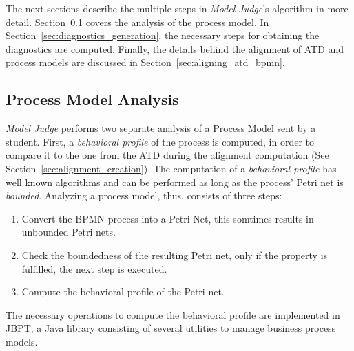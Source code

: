 The next sections describe the multiple steps in \emph{Model Judge}'s algorithm
in more detail. Section~\ref{sec:process_model_analysis} covers the analysis of
the process model. In Section~\ref{sec:diagnostics_generation}, the necessary
steps for obtaining the diagnostics are computed. Finally, the details behind
the alignment of ATD and process models are discussed in
Section~\ref{sec:aligning_atd_bpmn}.

\subsection{Process Model Analysis}
\label{sec:process_model_analysis}

\emph{Model Judge} performs two separate analysis of a Process Model sent by a
student. First, a \emph{behavioral profile} of the process is computed, in order
to compare it to the one from the ATD during the alignment computation (See
Section~\ref{sec:alignment_creation}). The computation of a \emph{behavioral
  profile} has well known algorithms and can be performed as long as the
process' Petri net is \emph{bounded}\cite[Section IV.B]{murata1989petri}.
Analyzing a process model, thus, consists of three steps:
\begin{enumerate}
  \item Convert the BPMN process into a Petri Net, this somtimes results in
    unbounded Petri nets.
  \item Check the boundedness of the resulting Petri net, only if the
    property is fulfilled, the next step is executed.
  \item Compute the behavioral profile of the Petri net.  
\end{enumerate}

The necessary operations to compute the behavioral profile are implemented in
JBPT\cite{polyvyanyy2013towards}, a Java library consisting of several utilities
to manage business process models.

